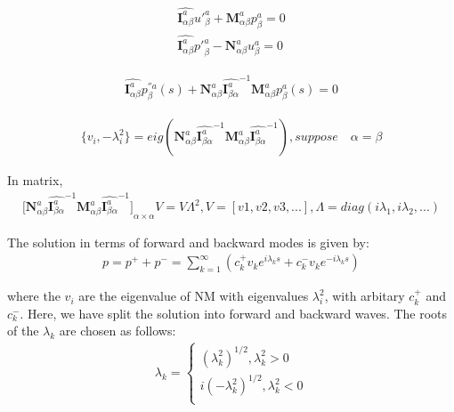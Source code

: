 \documentclass{Note}
\begin{document}
\begin{equation}
\begin{aligned}
\widehat{\textbf{I}_{\alpha\beta}^a} {u'}_\beta^a+\textbf{M}_{\alpha\beta}^a p_\beta^a =0\\
\widehat{\textbf{I}_{\alpha\beta}^a} {p'}_\beta^a-\textbf{N}_{\alpha\beta}^a u_\beta^a=0
\end{aligned}
\end{equation}

\begin{equation}
\begin{aligned}
\widehat{\textbf{I}_{\alpha\beta}^a} p_\beta^{''a}(s)+\textbf{N}_{\alpha\beta}^a  {\widehat{\textbf{I}_{\beta \alpha}^a}}^{-1} \textbf{M}_{\alpha\beta}^a p_\beta^a(s) =0
\end{aligned}
\end{equation}

\begin{equation}
\begin{aligned}
\{v_i , -\lambda_i^2\}=eig (\textbf{N}_{\alpha\beta}^a  {\widehat{\textbf{I}_{\beta \alpha}^a}}^{-1} \textbf{M}_{\alpha\beta}^a {\widehat{\textbf{I}_{\beta \alpha}^a}}^{-1}),suppose \quad \alpha=\beta
\end{aligned}
\end{equation}

In matrix,
\begin{equation}
\begin{aligned}
{\lbrack \textbf{N}_{\alpha\beta}^a  {\widehat{\textbf{I}_{\beta \alpha}^a}}^{-1} \textbf{M}_{\alpha\beta}^a {\widehat{\textbf{I}_{\beta \alpha}^a}}^{-1} 
\rbrack}_{\alpha\times\alpha}
 V=V \Lambda^2,
V=[v1,v2,v3,...],\Lambda=diag(i\lambda_1,i\lambda_2,...)
\end{aligned}
\end{equation}

The solution in terms of forward and backward modes is given by:
\begin{equation}
\begin{aligned}
p=p^{+}+p^{-}=\sum_{k=1}^\infty(c_k^{+}v_k e^{i\lambda_ks}+c_k^{-}v_k e^{-i\lambda_ks})
\end{aligned}
\end{equation}

where the $v_i$ are the eigenvalue of NM with eigenvalues $\lambda_i^2$, with arbitary $c_k^{+}$ and  $c_k^{-}$.  Here, we have split the solution into forward and backward waves. The roots of the $\lambda_k$ are chosen as follows:
\begin{equation}
\begin{aligned}
\lambda_k=\left\{\begin{matrix}
(\lambda_k^2)^{1/2}, \lambda_k^2>0\\
i(-\lambda_k^2)^{1/2}, \lambda_k^2<0\\
\end{matrix}\right.\\
\end{aligned}
\end{equation}
\end{document}
